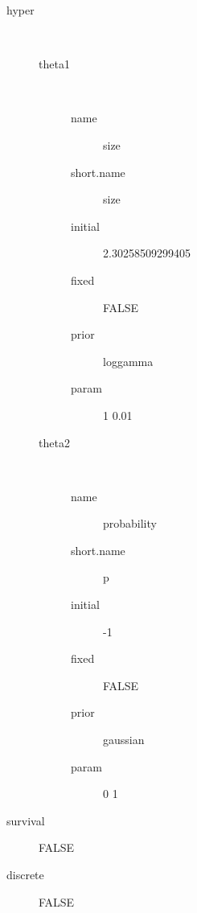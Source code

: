 \begin{description}
	\item[hyper]\ 
	 \begin{description}
	 	\item[theta1]\ 
	 	 \begin{description}
	 	 	 \item[ name ] size 
	 	 	 \item[ short.name ] size 
	 	 	 \item[ initial ] 2.30258509299405 
	 	 	 \item[ fixed ] FALSE 
	 	 	 \item[ prior ] loggamma 
	 	 	 \item[ param ] 1 0.01 
	 	 \end{description}
	 	\item[theta2]\ 
	 	 \begin{description}
	 	 	 \item[ name ] probability 
	 	 	 \item[ short.name ] p 
	 	 	 \item[ initial ] -1 
	 	 	 \item[ fixed ] FALSE 
	 	 	 \item[ prior ] gaussian 
	 	 	 \item[ param ] 0 1 
	 	 \end{description}
	 \end{description}
	 \item[ survival ] FALSE 
	 \item[ discrete ] FALSE 
\end{description}
